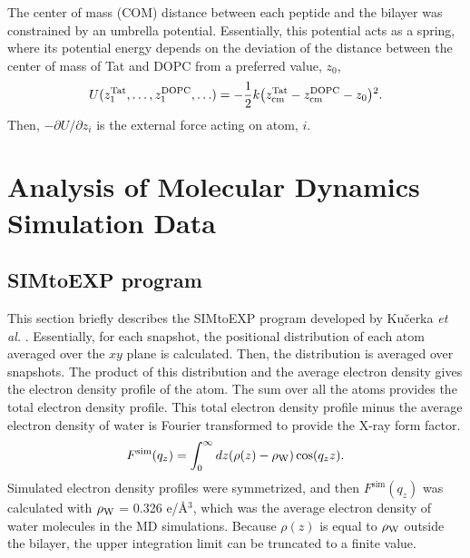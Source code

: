The center of mass (COM) distance between each peptide and the bilayer was 
constrained by an umbrella potential. 
Essentially, this potential acts as a spring, 
where its potential energy depends on the deviation of the distance 
between the center of mass of Tat and DOPC from a preferred value, $z_0$,
\begin{equation*}
  U(z_1^{\textrm{Tat}},\ldots,z_1^{\textrm{DOPC}},\ldots) = 
  -\frac{1}{2} k 
  \mathopen{}\left( z_{\textrm{cm}}^{\textrm{Tat}} - z_{\textrm{cm}}^{\textrm{DOPC}} - z_0 \right)\mathclose{}^2.
\end{equation*}
Then, $-\partial U/\partial z_i$ is the external force acting 
on atom, $i$. 

\section{Analysis of Molecular Dynamics Simulation Data}
\subsection{SIMtoEXP program}\label{sec:SIMtoEXP}
This section briefly describes the SIMtoEXP program
developed by Ku\v{c}erka \textit{et al.} \cite{Kucerka10}.
Essentially, for each snapshot, the positional distribution of each atom
averaged over the $xy$ plane is calculated. Then, the distribution is
averaged over snapshots. The product of this distribution and the average
electron density gives the electron density profile of the atom. The sum 
over all the atoms provides the total electron density profile. This total
electron density profile minus the average electron density of water
is Fourier transformed to provide the X-ray form factor.
\begin{equation}
  F^\textrm{sim}(q_z) = \int_0^\infty\mathop{dz} (\rho(z)-\rho_\textrm{W})\cos (q_zz).
\end{equation}
Simulated electron density profiles were symmetrized, and then
$F^\textrm{sim}(q_z)$ was calculated with $\rho_\textrm{W}$ = 0.326 e/\AA$^3$,
which was the average electron density of water molecules in the MD simulations.
Because $\rho(z)$ is equal to $\rho_\textrm{W}$ outside the bilayer, the upper 
integration limit can be truncated to a finite value. 

